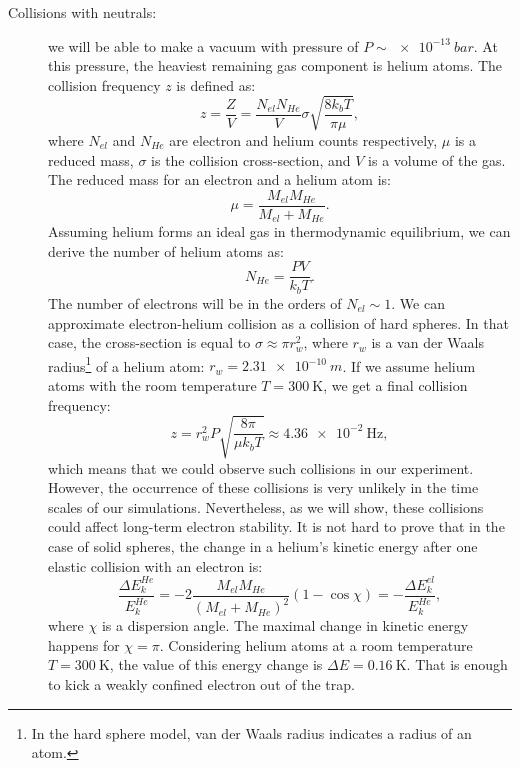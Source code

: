 \begin{description}
	\item[Collisions with neutrals:] we will be able to make a vacuum with pressure of $P\sim \SI{e-13}{bar}$. At this pressure, the heaviest remaining gas component is helium atoms. The collision frequency $z$ is defined as:
\begin{equation}
	\label{collision frequency}
	z = \frac{Z}{V} = \frac{N_{el} N_{He}}{V} \sigma \sqrt{\frac{8 k_b T}{\pi \mu}},
\end{equation}
where $N_{el}$ and $N_{He}$ are electron and helium counts respectively, $\mu$ is a reduced mass, $\sigma$ is the collision cross-section, and $V$ is a volume of the gas. The reduced mass for an electron and a helium atom is:
\begin{equation}
	\label{reduced mass}
	\mu = \frac{M_{el} M_{He}}{M_{el} + M_{He}}.
\end{equation}
Assuming helium forms an ideal gas in thermodynamic equilibrium, we can derive the number of helium atoms as:
\begin{equation}
	\label{number of helium atoms}
	N_{He} = \frac{P V}{k_b T}.
\end{equation}
The number of electrons will be in the orders of $N_{el} \sim 1$. We can approximate electron-helium collision as a collision of hard spheres. In that case, the cross-section is equal to $\sigma \approx \pi r_w^2$, where $r_w$ is a van der Waals radius\footnote{In the hard sphere model, van der Waals radius indicates a radius of an atom.} of a helium atom: $r_w = \SI{2.31e-10}{m}$. If we assume helium atoms with the room temperature $T=\SI{300}{\kelvin}$, we get a final collision frequency:
\begin{equation}
	\label{collision frequency value}
	z = r_w^2 P \sqrt{\frac{8\pi}{\mu k_b T}} \approx \SI{4.36e-2}{\hertz},
\end{equation}
which means that we could observe such collisions in our experiment. However, the occurrence of these collisions is very unlikely in the time scales of our simulations. Nevertheless, as we will show, these collisions could affect long-term electron stability. It is not hard to prove that in the case of solid spheres, the change in a helium's kinetic energy after one elastic collision with an electron is:
\begin{equation}
	\label{change in energy after collision}
	\frac{\Delta E_k^{He}}{E_k^{He}} = \minus 2\frac{M_{el} M_{He}}{(M_{el} + M_{He})^2} \left(1 \minus \cos \chi \right) = \minus\frac{\Delta E_k^{el}}{E_k^{He}},
\end{equation}
where $\chi$ is a dispersion angle. The maximal change in kinetic energy happens for $\chi = \pi$. Considering helium atoms at a room temperature $T = \SI{300}{\kelvin}$, the value of this energy change is $\Delta E = \SI{0.16}{\kelvin}$. That is enough to kick a weakly confined electron out of the trap.
\end{description}	

